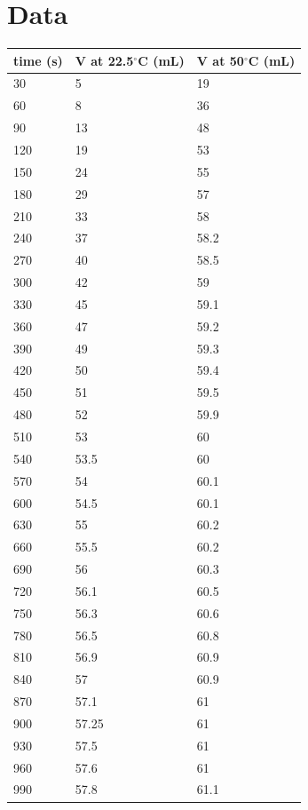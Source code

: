 \documentclass[12pt]{article}
\begin{document}
	\section{Data}
	\begin{flushleft}
	\begin{tabular}{ l|l|l }
		time (s) & V at 22.5$^\circ$C (mL) & V at 50$^\circ$C (mL) \\
		\hline
		30 & 5 & 19 \\
		60 & 8 & 36 \\
		90 & 13 & 48 \\
		120 & 19 & 53 \\
		150 & 24 & 55 \\
		180 & 29 & 57 \\
		210 & 33 & 58 \\
		240 & 37 & 58.2 \\
		270 & 40 & 58.5 \\
		300 & 42 & 59 \\
		330 & 45 & 59.1 \\
		360 & 47 & 59.2 \\
		390 & 49 & 59.3 \\
		420 & 50 & 59.4 \\
		450 & 51 & 59.5 \\
		480 & 52 & 59.9 \\
		510 & 53 & 60 \\
		540 & 53.5 & 60 \\
		570 & 54 & 60.1 \\
		600 & 54.5 & 60.1 \\
		630 & 55 & 60.2 \\
		660 & 55.5 & 60.2 \\
		690 & 56 & 60.3 \\
		720 & 56.1 & 60.5 \\
		750 & 56.3 & 60.6 \\
		780 & 56.5 & 60.8 \\
		810 & 56.9 & 60.9 \\
		840 & 57 & 60.9 \\
		870 & 57.1 & 61 \\
		900 & 57.25 & 61 \\
		930 & 57.5 & 61 \\
		960 & 57.6 & 61 \\
		990 & 57.8 & 61.1
	\end{tabular}
	\end{flushleft}
\end{document}

